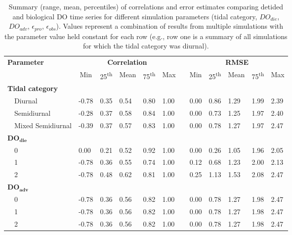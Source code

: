 \documentclass[letterpaper,12pt,oneside]{article}\usepackage[]{graphicx}\usepackage[]{color}
\begin{document}
%
\begin{table}[h]
\caption{Summary (range, mean, percentiles) of correlations and error estimates comparing detided and biological \ac{DO} time series for different simulation parameters (tidal category, $DO_{die}$, $DO_{adv}$, $\epsilon_{pro}$, $\epsilon_{obs}$).  Values represent a combination of results from multiple simulations with the parameter value held constant for each row (e.g., row one is a summary of all simulations for which the tidal category was diurnal).\label{tab:dtd_perf1}} 
\begin{center}
\begin{tabular}{llllllclllll}
\hline\hline
\multicolumn{1}{l}{\bfseries Parameter}&\multicolumn{5}{c}{\bfseries Correlation}&\multicolumn{1}{c}{\bfseries }&\multicolumn{5}{c}{\bfseries RMSE}\tabularnewline
\cline{2-6} \cline{8-12}
\multicolumn{1}{l}{}&\multicolumn{1}{c}{Min}&\multicolumn{1}{c}{25\textsuperscript{th}}&\multicolumn{1}{c}{Mean}&\multicolumn{1}{c}{75\textsuperscript{th}}&\multicolumn{1}{c}{Max}&\multicolumn{1}{c}{}&\multicolumn{1}{c}{Min}&\multicolumn{1}{c}{25\textsuperscript{th}}&\multicolumn{1}{c}{Mean}&\multicolumn{1}{c}{75\textsuperscript{th}}&\multicolumn{1}{c}{Max}\tabularnewline
\hline
{\bfseries Tidal category}&&&&&&&&&&&\tabularnewline
~~Diurnal&-0.78&0.35&0.54&0.80&1.00&&0.00&0.86&1.29&1.99&2.39\tabularnewline
~~Semidiurnal&-0.28&0.37&0.58&0.84&1.00&&0.00&0.73&1.25&1.97&2.40\tabularnewline
~~Mixed Semidiurnal&-0.39&0.37&0.57&0.83&1.00&&0.00&0.78&1.27&1.97&2.47\tabularnewline
\hline
{\bfseries $\boldsymbol{DO_{die}}$}&&&&&&&&&&&\tabularnewline
~~0& 0.00&0.21&0.52&0.92&1.00&&0.00&0.26&1.05&1.96&2.05\tabularnewline
~~1&-0.78&0.36&0.55&0.74&1.00&&0.12&0.68&1.23&2.00&2.13\tabularnewline
~~2&-0.78&0.48&0.62&0.81&1.00&&0.25&1.13&1.53&2.08&2.47\tabularnewline
\hline
{\bfseries $\boldsymbol{DO_{adv}}$}&&&&&&&&&&&\tabularnewline
~~0&-0.78&0.36&0.56&0.82&1.00&&0.00&0.78&1.27&1.98&2.47\tabularnewline
~~1&-0.78&0.36&0.56&0.82&1.00&&0.00&0.78&1.27&1.98&2.47\tabularnewline
~~2&-0.78&0.36&0.56&0.82&1.00&&0.00&0.78&1.27&1.98&2.47\tabularnewline

\end{tabular}
\end{center}
\end{table}
\end{document}
